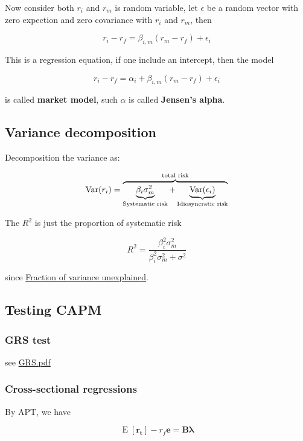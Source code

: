 \documentclass{article}
\begin{document}
Now consider both \(r_i\) and \(r_m\) is random variable, let
\(\epsilon\) be a random vector with zero expection and zero covariance
with \(r_i\) and \(r_m\), then

\[ 
r_i-r_f=\beta_{i,m}(r_m-r_f)+\epsilon_i
\]

This is a regression equation, if one include an intercept, then the
model

\[ 
r_i-r_f=\alpha_i+\beta_{i,m}(r_m-r_f)+\epsilon_i
\]

is called \textbf{market model}, such \(\alpha\) is called
\textbf{Jensen's alpha}.

\hypertarget{variance-decomposition}{%
\subsection{Variance decomposition}\label{variance-decomposition}}

Decomposition the variance as:

\[ \operatorname{Var}(r_i)=\overbrace{\underbrace{\beta_i\sigma_m^2}_{\text{Systematic risk}}+\underbrace{\operatorname{Var}(\epsilon_i)}_{\text{Idiosyncratic risk}}}^{\text{total risk}} \]

The \(R^2\) is just the proportion of systematic risk

\[ R^2=\frac{\beta_i^2\sigma_m^2}{\beta_i^2\sigma_m^2+\sigma^2} \]

since
\href{https://en.wikipedia.org/wiki/Fraction_of_variance_unexplained}{Fraction
of variance unexplained}.

\hypertarget{testing-capm}{%
\subsection{Testing CAPM}\label{testing-capm}}

\hypertarget{grs-test}{%
\subsubsection{GRS test}\label{grs-test}}

see \url{GRS.pdf}

\hypertarget{cross-sectional-regressions}{%
\subsubsection{Cross-sectional
regressions}\label{cross-sectional-regressions}}

By APT, we have

\[ \mathop{\text{E}}[\bm{\mathbf{r_t}}]-r_f \bm{\mathbf{e}}=\bm{\mathbf{B\lambda}} \]
\end{document}
